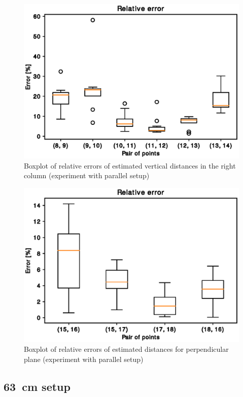 \begin{figure}
\includegraphics[width=\linewidth]{experiments/rightcolumn1.eps}
\caption{Boxplot of relative errors of estimated vertical distances in the right column (experiment with parallel setup)}
\label{fig:verticalright-boxplot}
\end{figure}

\begin{figure}
\includegraphics[width=\linewidth]{experiments/table1.eps}
\caption{Boxplot of relative errors of estimated distances for perpendicular plane (experiment with parallel setup)}
\label{fig:table-boxplot}
\end{figure}


\subsection*{63~cm setup}
\label{ss:63results}


